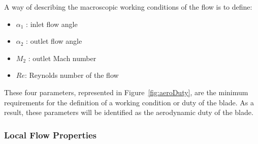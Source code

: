 \documentclass[11pt,a4paper,twocolumn]{article}
\begin{document}

A way of describing the macroscopic working conditions of the flow is to define:

\begin{itemize}
    \item $\alpha_1$ : inlet flow angle
    \item $\alpha_2$ : outlet flow angle
    \item $M_2$ : outlet Mach number
    \item $Re$: Reynolds number of the flow
\end{itemize}

These four parameters, represented in Figure~\ref{fig:aeroDuty}, are the minimum requirements for the definition of a working condition or duty of the blade. As a result, these parameters will be identified as the aerodynamic duty of the blade.



\subsubsection{Local Flow Properties}



\end{document}
